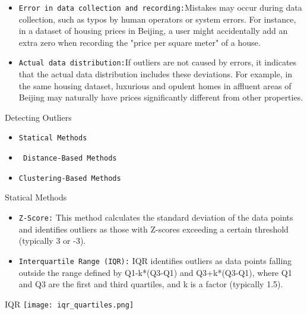 \documentclass[serif, aspectratio=169]{beamer}
\begin{document}
\begin{frame}
    \begin{itemize}
        \item \texttt{\color{red}Error in data collection and recording:}Mistakes may occur during data collection, such as typos by human operators or system errors. For instance, in a dataset of housing prices in Beijing, a user might accidentally add an extra zero when recording the "price per square meter" of a house.

        \item \texttt{\color{red}Actual data distribution:}If outliers are not caused by errors, it indicates that the actual data distribution includes these deviations. For example, in the same housing dataset, luxurious and opulent homes in affluent areas of Beijing may naturally have prices significantly different from other properties.
    \end{itemize}
\end{frame}

\begin{frame}{Detecting Outliers}
    \begin{itemize}
        \item \texttt{\color{red}Statical Methods}
        \item \texttt{\color{red} Distance-Based Methods}
        \item \texttt{\color{red}Clustering-Based Methods}
    \end{itemize}
\end{frame}


\begin{frame}{Statical Methods}
    \begin{itemize}
        \item \texttt{\color{red}Z-Score:} This method calculates the standard deviation of the data points and identifies outliers as those with Z-scores exceeding a certain threshold (typically 3 or -3).
        \item \texttt{\color{red}Interquartile Range (IQR):} IQR identifies outliers as data points falling outside the range defined by Q1-k*(Q3-Q1) and Q3+k*(Q3-Q1), where Q1 and Q3 are the first and third quartiles, and k is a factor (typically 1.5).
    \end{itemize}
\end{frame}

\begin{frame}{IQR}
    \centering
    \texttt{[image: iqr\_quartiles.png]}
\end{frame}
\end{document}
